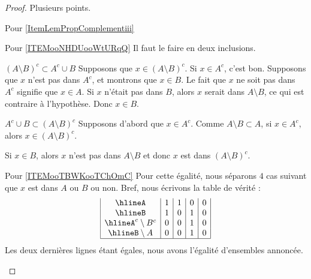 \begin{proof}
    Plusieurs points.
    \begin{subproof}
    \item[Pour \ref{ItemLemPropComplementiii}]
    \item[Pour \ref{ITEMooNHDUooWtURqQ}]
        Il faut le faire en deux inclusions.
        \begin{subproof}
        \item[\( (A\setminus B)^c\subset A^c\cup B\)]
            Supposons que \( x\in(A\setminus B)^c\). Si \( x\in A^c\), c'est bon. Supposons que \( x\) n'est pas dans \( A^c\), et montrons que \( x\in B\). Le fait que \( x\) ne soit pas dans \( A^c\) signifie que \( x\in A\). Si \( x\) n'était pas dans \( B\), alors \( x\) serait dans \( A\setminus B\), ce qui est contraire à l'hypothèse. Donc \( x\in B\).
        \item[\( A^c\cup B\subset (A\setminus B)^c\)]
            Supposons d'abord que \( x\in A^c\). Comme \( A\setminus B\subset A\), si \( x\in A^c\), alors \( x\in (A\setminus B)^c\).

            Si \( x\in B\), alors \( x\) n'est pas dans \( A\setminus B\) et donc \( x\) est dans \( (A\setminus B)^c\).
        \end{subproof}
    \item[Pour \ref{ITEMooTBWKooTChOmC}]
        Pour cette égalité, nous séparons \( 4\) cas suivant que \( x\) est dans \( A\) ou \( B\) ou non. Bref, nous écrivons la table de vérité :
\begin{equation}       
    \begin{array}{|c|c|c|c|c|}
        \hline%
        A   &   1   & 1 & 0 & 0\\
        \hline%
        B&1&0&1&0\\
        \hline%
        A^c\setminus B^c & 0 & 0 &1&0\\
        \hline%
        B\setminus A & 0 & 0 &1&0\\
        \hline%
    \end{array}
\end{equation}
Les deux dernières lignes étant égales, nous avons l'égalité d'ensembles annoncée.
    \end{subproof}
\end{proof}

